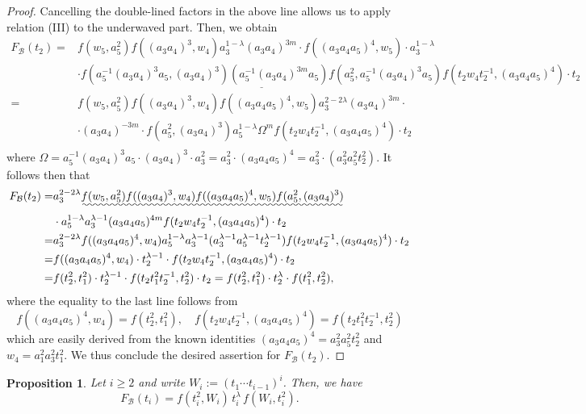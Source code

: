 \documentclass[a4paper,10pt,reqno]{amsart}
\newcommand\FB{F_{\mathcal{B}}}
\newtheorem{prop}[thm]{Proposition}
\begin{document}
\begin{proof}
Cancelling the double-lined factors in the above line
allows us to apply relation (III) to the underwaved part.
Then, we obtain
\allowdisplaybreaks
\begin{align*}
\FB(t_2)=& f(w_5,a_5^2)f((a_3a_4)^3,w_4)
a_3^{1-\lambda}
(a_3a_4)^{3m}\cdot
f((a_3a_4a_5)^4,w_5)\cdot
a_3^{1-\lambda} \\
&\cdot
\underline{f(a_5^{-1}(a_3a_4)^3a_5,(a_3a_4)^3)
(a_5^{-1}(a_3a_4)^{3m}a_5)
f(a_5^2,a_5^{-1}(a_3a_4)^3a_5)}
f(t_2w_4t_2^{-1},(a_3a_4a_5)^4)
\cdot t_2 \\
=& f(w_5,a_5^2)f((a_3a_4)^3,w_4)
f((a_3a_4a_5)^4,w_5) a_3^{2-2\lambda}
(a_3a_4)^{3m}\cdot\\
&\cdot
(a_3a_4)^{-3m}
\cdot
f(a_5^2,(a_3a_4)^3)
a_5^{1-\lambda} \Omega^m
f(t_2w_4t_2^{-1},(a_3a_4a_5)^4)
\cdot t_2 \\
\end{align*}
where $\Omega=a_5^{-1}(a_3a_4)^3a_5\cdot (a_3a_4)^3\cdot
a_3^2=a_3^2\cdot(a_3a_4a_5)^4=a_3^2\cdot (a_3^2a_5^2t_2^2)$.
It follows then that
\begin{align*}
\FB(t_2)=&
a_3^{2-2\lambda}
\uwave{
f(w_5,a_5^2)f((a_3a_4)^3,w_4)
f((a_3a_4a_5)^4,w_5) 
f(a_5^2,(a_3a_4)^3)}
\\
&\cdot
a_5^{1-\lambda}
a_3^{\lambda-1}
(a_3a_4a_5)^{4m}
f(t_2w_4t_2^{-1},(a_3a_4a_5)^4)
\cdot t_2
\\
=&
a_3^{2-2\lambda}
f((a_3a_4a_5)^4,w_4) a_5^{1-\lambda}
a_3^{\lambda-1} (a_3^{\lambda-1}a_5^{\lambda-1}
t_2^{\lambda-1})
f(t_2w_4t_2^{-1},(a_3a_4a_5)^4)
\cdot t_2 \\
=&
f((a_3a_4a_5)^4,w_4)\cdot
t_2^{\lambda-1}\cdot
f(t_2w_4t_2^{-1},(a_3a_4a_5)^4)
\cdot t_2 \\
=&f(t_2^2,t_1^2)\cdot t_2^{\lambda-1}\cdot 
f(t_2t_1^2t_2^{-1},t_2^2)
\cdot t_2
=f(t_2^2,t_1^2)\cdot t_2^{\lambda}\cdot 
f(t_1^2,t_2^2),
\end{align*}
where the equality to the last line follows from
\begin{equation}
f((a_3a_4a_5)^4,w_4)=f(t_2^2,t_1^2),\quad
f(t_2w_4t_2^{-1},(a_3a_4a_5)^4)
=f(t_2t_1^2t_2^{-1},t_2^2)
\end{equation}
which are easily derived from the known identities
$(a_3a_4a_5)^4=a_3^2a_5^2t_2^2$ and $w_4=a_1^2a_3^2t_1^2$.
We thus conclude the desired assertion for
$\FB(t_2)$.
\end{proof}

\begin{prop}
Let $i\ge 2$ and write $W_i:=(t_1\cdots t_{i-1})^i$.
Then, we have
$$
F_{\mathcal{B}}(t_i)=f(t_i^2,W_i)\,t_i^\lambda \,f(W_i,t_i^2).
$$
\end{prop}
\end{document}
